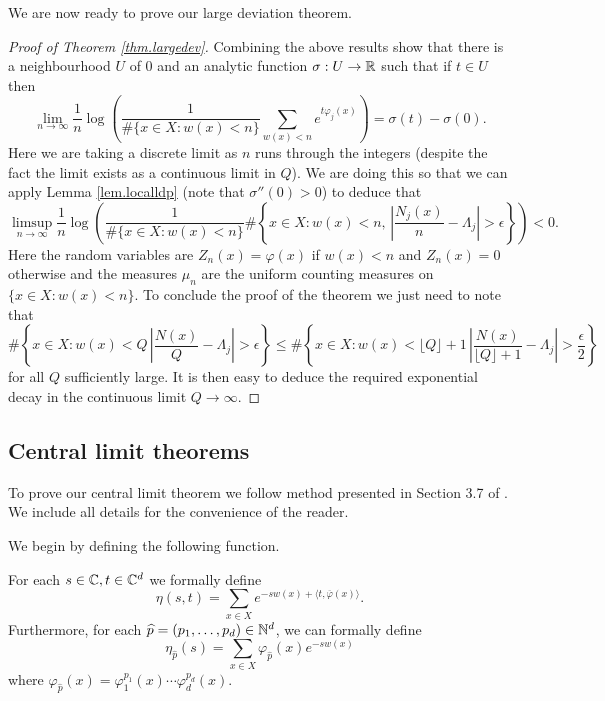 \documentclass[12pt,a4paper,reqno]{amsart}
\begin{document}
We are now ready to prove our large deviation theorem.

\begin{proof}[Proof of Theorem \ref{thm.largedev}]
Combining the above results show that there is a neighbourhood  $U$ of $0$ and an analytic function $\sigma : U \to{\mathbb R}$  such that if $t \in U$ then 
\[
\lim_{n \to\infty} \frac{1}{n} \log \left( \frac{1}{\#\{x \in X : w(x) < n \} } \sum_{w(x) < n } e^{t \varphi_j(x)} \right) = \sigma(t) - \sigma(0).
\]
Here we are taking a discrete limit as $n$ runs through the integers (despite the fact the limit exists as a continuous limit in $Q$). We are doing this so that we can apply Lemma \ref{lem.localldp} (note that $\sigma''(0) > 0$) to deduce that
\[
\limsup_{n \to\infty} \frac{1}{n} \log \left( \frac{1}{\#\{x \in X : w(x) < n \}} \#\left\{ x\in X: w(x) < n, \, \left| \frac{N_j(x)}{n} - \Lambda_j \right| > \epsilon \right\}\right) < 0.
\]
Here the random variables are $Z_n(x) = \varphi(x)$ if $w(x) < n$ and $Z_n(x) = 0$ otherwise and the measures $\mu_n$ are the uniform counting measures on $\{x \in X: w(x) < n \}$.
To conclude the proof of the theorem we just need to note that 
\[
\#\left\{ x \in X : w(x) < Q \, \left| \frac{N(x)}{Q} - \Lambda_j \right| > \epsilon  \right\} \le \#\left\{ x \in X : w(x) < \lfloor Q \rfloor + 1 \, \left| \frac{N(x)}{\lfloor Q \rfloor + 1} - \Lambda_j \right| > \frac{\epsilon}{2}  \right\} 
\]
for all $Q$ sufficiently large. It is then easy to deduce the required exponential decay in the continuous limit $Q \to \infty$.
\end{proof}



\subsection{Central limit theorems}\label{subsec:CLT}

To prove our central limit theorem we follow method presented in Section 3.7 of \cite{CanPol2}. We include all details for the convenience of the reader.

We begin by defining the following function.
\begin{definition}
For each $s \in {\mathbb C}, t \in {\mathbb C}^d$ we formally define
\[
\eta(s,t) = \sum_{x \in X}  e^{ -s w(x) + \langle t, \overline{\varphi}(x) \rangle}.
\]
Furthermore, for each $\widehat{p} = (p_1, \ldots, p_d)  \in {\mathbb N}^d$, we can formally define
\[
\eta_{\widehat{p}}(s) = \sum_{x \in X} \varphi_{\widehat{p}}(x) e^{-sw(x)}
\]
where $\varphi_{\widehat{p}}(x) = \varphi_1^{p_1}(x) \cdots \varphi_d^{p_d}(x)$.
\end{definition}
\end{document}
